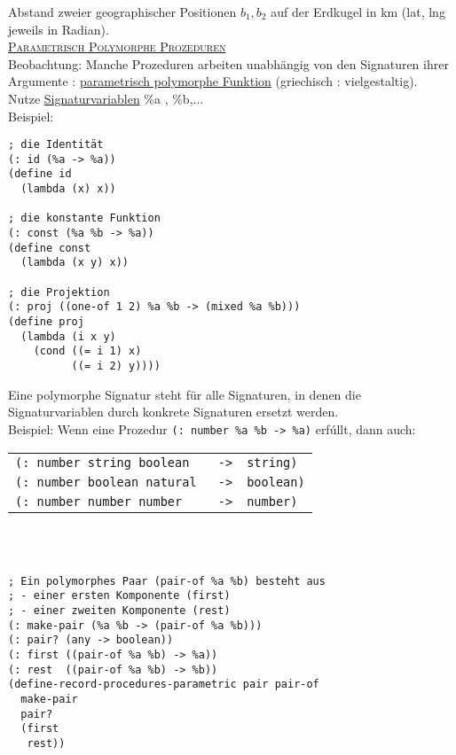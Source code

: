 Abstand zweier geographischer Positionen $b_1,b_2$ auf der Erdkugel in km (lat, lng jeweils in Radian).\\
\underline{\textsc{Parametrisch Polymorphe Prozeduren}}\\
Beobachtung: Manche Prozeduren arbeiten unabhängig von den Signaturen ihrer Argumente : \underline{parametrisch polymorphe Funktion} (griechisch : vielgestaltig).\\
Nutze \underline{Signaturvariablen} \%a , \%b,...\\
Beispiel:\\
\begin{lstlisting}
; die Identität
(: id (%a -> %a))
(define id
  (lambda (x) x))

; die konstante Funktion
(: const (%a %b -> %a))
(define const
  (lambda (x y) x))

; die Projektion
(: proj ((one-of 1 2) %a %b -> (mixed %a %b)))
(define proj
  (lambda (i x y)
    (cond ((= i 1) x)
          ((= i 2) y))))
\end{lstlisting}
Eine polymorphe Signatur steht für alle Signaturen, in denen die Signaturvariablen durch konkrete Signaturen ersetzt werden.\\
Beispiel: Wenn eine Prozedur \lstinline!(: number %a %b -> %a)! erfúllt, dann auch:\\
\begin{tabular}{lcl}
\lstinline!(: number string boolean!&\lstinline! ->!& \lstinline!string)! \\
\lstinline!(: number boolean natural!&\lstinline! ->!& \lstinline!boolean)! \\
\lstinline!(: number number number!&\lstinline! ->!& \lstinline!number)! \\
\end{tabular}
\vspace*{1cm}\\
\hspace*{1cm} \\
\begin{lstlisting}
; Ein polymorphes Paar (pair-of %a %b) besteht aus
; - einer ersten Komponente (first)
; - einer zweiten Komponente (rest)
(: make-pair (%a %b -> (pair-of %a %b)))
(: pair? (any -> boolean))
(: first ((pair-of %a %b) -> %a))
(: rest  ((pair-of %a %b) -> %b))
(define-record-procedures-parametric pair pair-of
  make-pair
  pair?
  (first
   rest))
\end{lstlisting}
